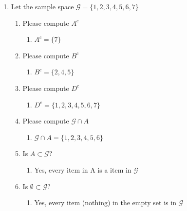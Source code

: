 \documentclass[krantz1,ChapterTOCs]{krantz}
\begin{document}
\begin{enumerate}
\begin{enumerate}
    \end{enumerate}
    \item Let the sample space $\mathcal{G} = \{ 1,2,3,4,5,6,7 \}$
    \begin{enumerate}
       \item Please compute $A^{c}$
           \begin{enumerate}
                \item {\color{red} $A^{c} = \{7\}$  }
            \end{enumerate}
        
       \item Please compute $B^{c}$
           \begin{enumerate}
                \item {\color{red} $B^{c} = \{2,4,5\}$  } 
            \end{enumerate}
        
       \item Please compute $D^{c}$
           \begin{enumerate}
                \item {\color{red} $D^{c} = \{1,2,3,4,5,6,7\}$  }
            \end{enumerate}
        
       \item Please compute $\mathcal{G} \cap A$
           \begin{enumerate}
                \item {\color{red} $ \mathcal{G} \cap A = \{ 1,2,3,4,5,6 \} $  }
            \end{enumerate}
        
       \item Is $A \subset \mathcal{G}$?
           \begin{enumerate}
                \item {\color{red} Yes, every item in A is a item in $\mathcal{G}$  }
            \end{enumerate}
        
       \item Is $\emptyset \subset \mathcal{G}$?
           \begin{enumerate}
                \item {\color{red} Yes, every item (nothing) in the empty set is in $\mathcal{G}$  }
            \end{enumerate}
        
    \end{enumerate}
    

\end{enumerate}
\end{document}
